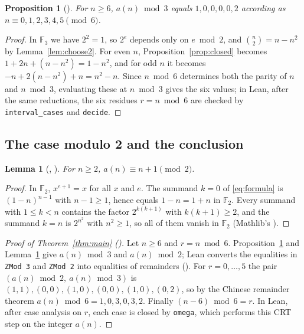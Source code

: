 \documentclass[11pt]{amsart}
\theoremstyle{plain}
\newtheorem{lemma}[theorem]{Lemma}
\newtheorem{proposition}[theorem]{Proposition}
\theoremstyle{definition}
\newcommand{\F}{\mathbb{F}}
\begin{document}
\begin{proposition}[]\label{prop:mod3}
For $n\ge6$, $a(n)\bmod3$ equals $1,0,0,0,0,2$ according as $n\equiv0,1,2,3,4,5\pmod6$.
\end{proposition}

\begin{proof}
In $\F_3$ we have $2^2=1$, so $2^e$ depends only on $e\bmod2$, and $\binom n2=n-n^2$ by Lemma~\ref{lem:choose2}.
For even $n$, Proposition~\ref{prop:closed} becomes $1+2n+(n-n^2)=1-n^2$, and for odd $n$ it becomes $-n+2(n-n^2)+n=n^2-n$.
Since $n\bmod6$ determines both the parity of $n$ and $n\bmod3$, evaluating these at $n\bmod3$ gives the six values; in Lean, after the same reductions, the six residues $r=n\bmod6$ are checked by \texttt{interval\_cases} and \texttt{decide}.
\end{proof}

\subsection*{The case modulo 2 and the conclusion}

\begin{lemma}[, ]\label{lem:mod2}
For $n\ge2$, $a(n)\equiv n+1\pmod2$.
\end{lemma}

\begin{proof}
In $\F_2$, $x^{e+1}=x$ for all $x$ and $e$.
The summand $k=0$ of \eqref{eq:formula} is $(1-n)^{n-1}$ with $n-1\ge1$, hence equals $1-n=1+n$ in $\F_2$.
Every summand with $1\le k<n$ contains the factor $2^{k(k+1)}$ with $k(k+1)\ge2$, and the summand $k=n$ is $2^{n^2}$ with $n^2\ge1$, so all of them vanish in $\F_2$ (Mathlib's ).
\end{proof}

\begin{proof}[Proof of Theorem~\ref{thm:main} ()]
Let $n\ge6$ and $r=n\bmod 6$.
Proposition~\ref{prop:mod3} and Lemma~\ref{lem:mod2} give $a(n)\bmod3$ and $a(n)\bmod2$; Lean converts the equalities in \texttt{ZMod 3} and \texttt{ZMod 2} into equalities of remainders ().
For $r=0,\dots,5$ the pair $(a(n)\bmod2,\ a(n)\bmod3)$ is $(1,1),(0,0),(1,0),(0,0),(1,0),(0,2)$, so by the Chinese remainder theorem $a(n)\bmod6=1,0,3,0,3,2$. Finally $(n-6)\bmod6=r$.
In Lean, after case analysis on $r$, each case is closed by \texttt{omega}, which performs this CRT step on the integer $a(n)$.
\end{proof}
\end{document}
